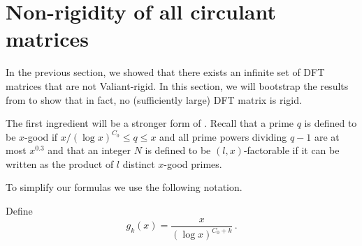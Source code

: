 \documentclass{toc}
\begin{document}
\section{Non-rigidity of all circulant matrices}\label{sec_Fourier2}
In the previous section, we showed that there exists an infinite set of %
DFT %
 matrices that are not Valiant-rigid.  In this section, we will bootstrap the results from  to show that in fact, %
no (sufficiently large) DFT matrix is rigid.

The first ingredient will be a stronger form of .  Recall that a prime $q$ is defined to be $x$-good if $x/(\log x)^{C_0} \leq q \leq x$ and all prime powers dividing $q-1$ are at most $x^{0.3}$ and that an integer $N$ is defined to be $(l,x)$-factorable if it can be written as the product of $l$ distinct $x$-good primes.

%
%
To simplify our formulas we use the following notation.   %
\begin{notation}    \label{not:bypolylog}
Define 
\[
g_k(x) = \frac{x}{(\log x)^{C_0 + k}} \,.
\]
\end{notation}
%
\end{document}
